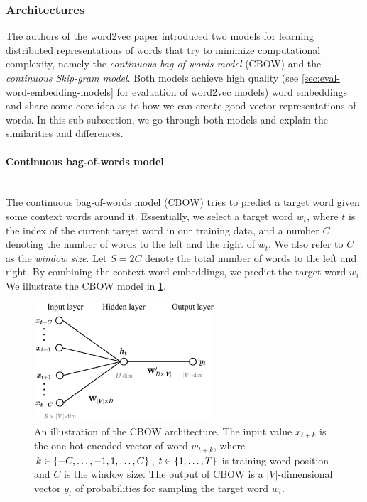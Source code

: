 \subsubsection{Architectures}
The authors of the word2vec paper introduced two models for learning distributed representations of words that try to minimize computational complexity, namely the \textit{continuous bag-of-words model} (CBOW) and the \textit{continuous Skip-gram model}. Both models achieve high quality (see \cref{sec:eval-word-embedding-models} for evaluation of word2vec models) word embeddings and share some core idea as to how we can create good vector representations of words. In this sub-subsection, we go through both models and explain the similarities and differences.

\paragraph*{Continuous bag-of-words model}\mbox{} \\
The continuous bag-of-words model (CBOW) tries to predict a target word given some context words around it. Essentially, we select a target word $w_t$, where $t$ is the index of the current target word in our training data, and a number $C$ denoting the number of words to the left and the right of $w_t$. We also refer to $C$ as the \textit{window size}. Let $S=2C$ denote the total number of words to the left and right. By combining the context word embeddings, we predict the target word $w_t$. We illustrate the CBOW model in \cref{fig:cbow-model}.
\begin{figure}[H]
    \centering
    \includegraphics[width=0.6\textwidth]{thesis/figures/cbow_cropped.pdf}
    \caption{An illustration of the CBOW architecture. The input value $x_{t+k}$ is the one-hot encoded vector of word $w_{t+k}$, where $k \in \left\{-C, \ldots, -1, 1, \ldots, C\right\}$, $t \in \left\{1, \ldots, T\right\}$ is training word position and $C$ is the window size. The output of CBOW is a $|V|$-dimensional vector $y_t$ of probabilities for sampling the target word $w_t$.}
    \label{fig:cbow-model}
\end{figure}

